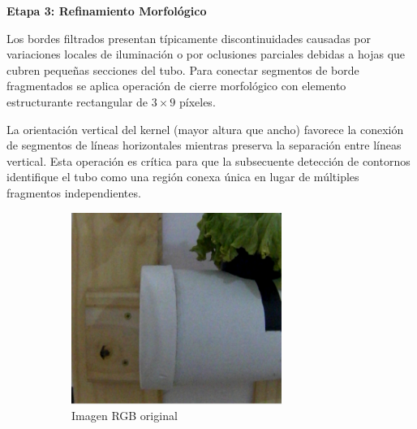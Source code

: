 \textbf{Etapa 3: Refinamiento Morfológico}

Los bordes filtrados presentan típicamente discontinuidades causadas por variaciones locales de iluminación o por oclusiones parciales debidas a hojas que cubren pequeñas secciones del tubo. Para conectar segmentos de borde fragmentados se aplica operación de cierre morfológico con elemento estructurante rectangular de $3 \times 9$ píxeles.

La orientación vertical del kernel (mayor altura que ancho) favorece la conexión de segmentos de líneas horizontales mientras preserva la separación entre líneas vertical. Esta operación es crítica para que la subsecuente detección de contornos identifique el tubo como una región conexa única en lugar de múltiples fragmentos independientes.

\begin{figure}[H]
\centering
\begin{subfigure}[b]{0.48\textwidth}
    \centering
    \includegraphics[width=\textwidth]{imagenes/detector_tubos_1_original.png}
    \caption{Imagen RGB original}
\end{subfigure}
\hfill
\begin{subfigure}[b]{0.48\textwidth}
    \centering

\end{subfigure}
\end{figure}
